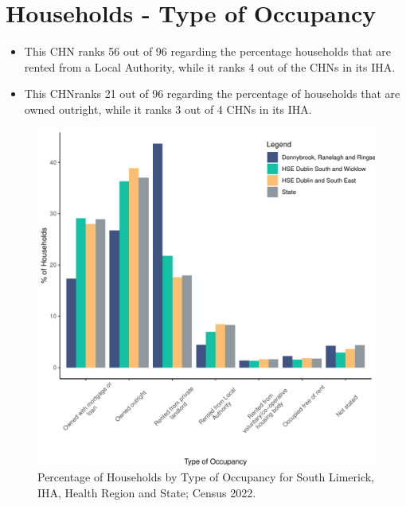 \documentclass{article}
\begin{document}
\section{Households - Type of Occupancy}\label{sect:Households}
\begin{itemize}
\item This CHN ranks  56 out of 96 regarding the percentage households that are rented from a Local Authority, while it ranks  4 out of the CHNs in its IHA. 
\item This CHNranks  21 out of 96 regarding the percentage of households that are owned outright, while it ranks   3 out of 4 CHNs in its IHA.
\end{itemize}
\begin{figure}[H]
	\centering
	\includegraphics[width = 140mm]{../figures/HouseholdsED.pdf}
	\caption{Percentage of Households by Type of Occupancy for South Limerick, IHA, Health Region and State; Census 2022.}
	\label{fig:vbnv}
	\end{figure}
\end{document}
